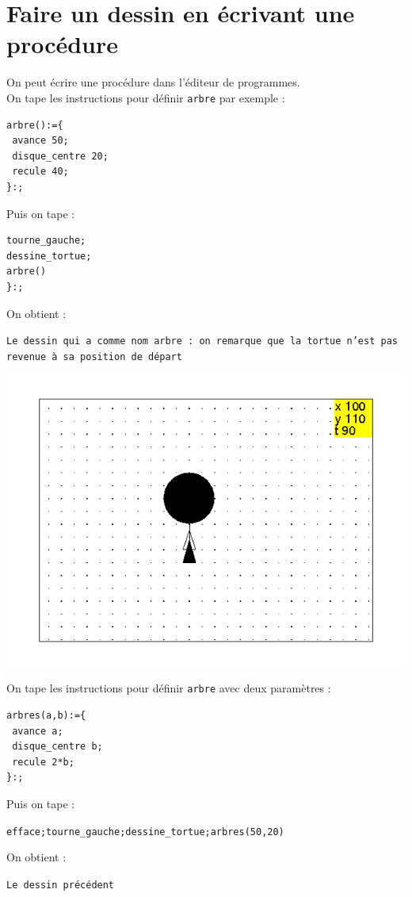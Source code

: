 \documentclass[a4paper,11pt]{book}
\begin{document}
\section{Faire un dessin en \'ecrivant une proc\'edure}
\noindent On peut \'ecrire une proc\'edure dans l'\'editeur de programmes.\\
On tape les instructions pour d\'efinir {\tt arbre} par exemple :
\begin{verbatim}
arbre():={
 avance 50;
 disque_centre 20;
 recule 40;
}:;
\end{verbatim}
Puis on tape :
\begin{verbatim}
tourne_gauche;
dessine_tortue;
arbre()
}:;
\end{verbatim}
On obtient :
\begin{center}{\tt Le dessin qui a comme nom arbre : on remarque que la tortue n'est pas revenue \`a sa position de d\'epart}\end{center}
\begin{center}\includegraphics[width=\textwidth]{tortuea}\end{center}
On tape les instructions pour d\'efinir {\tt arbre} avec deux param\`etres :
\begin{verbatim}
arbres(a,b):={
 avance a;
 disque_centre b;
 recule 2*b;
}:;
\end{verbatim}
Puis on tape :
\begin{center}{\tt efface;tourne\_gauche;dessine\_tortue;arbres(50,20)}\end{center}
On obtient :
\begin{center}{\tt Le dessin pr\'ec\'edent }\end{center}
\end{document}
